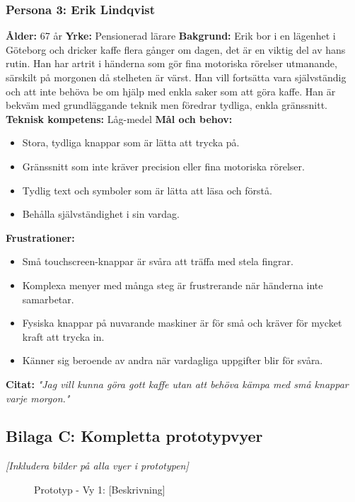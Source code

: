 \subsubsection{Persona 3: Erik Lindqvist}
\textbf{Ålder:} 67 år
\textbf{Yrke:} Pensionerad lärare
\textbf{Bakgrund:} Erik bor i en lägenhet i Göteborg och dricker kaffe flera gånger om dagen, det är en viktig del av hans rutin. Han har artrit i händerna som gör fina motoriska rörelser utmanande, särskilt på morgonen då stelheten är värst. Han vill fortsätta vara självständig och att inte behöva be om hjälp med enkla saker som att göra kaffe. Han är bekväm med grundläggande teknik men föredrar tydliga, enkla gränssnitt.
\textbf{Teknisk kompetens:} Låg-medel
\textbf{Mål och behov:}
\begin{itemize}
\item Stora, tydliga knappar som är lätta att trycka på.
\item Gränssnitt som inte kräver precision eller fina motoriska rörelser.
\item Tydlig text och symboler som är lätta att läsa och förstå.
\item Behålla självständighet i sin vardag.
\end{itemize}
\textbf{Frustrationer:}
\begin{itemize}
\item Små touchscreen-knappar är svåra att träffa med stela fingrar.
\item Komplexa menyer med många steg är frustrerande när händerna inte samarbetar.
\item Fysiska knappar på nuvarande maskiner är för små och kräver för mycket kraft att trycka in.
\item Känner sig beroende av andra när vardagliga uppgifter blir för svåra.
\end{itemize}
\textbf{Citat:} \textit{"Jag vill kunna göra gott kaffe utan att behöva kämpa med små knappar varje morgon."}


\subsection{Bilaga C: Kompletta prototypvyer}

\textit{[Inkludera bilder på alla vyer i prototypen]}

\begin{figure}[h]
    \centering
    \caption{Prototyp - Vy 1: [Beskrivning]}
\end{figure}

